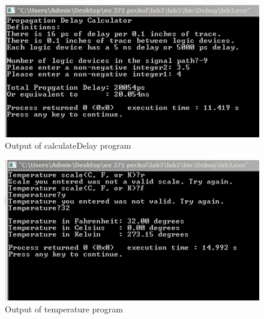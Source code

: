 \documentclass{article}
\begin{document}
    \begin{figure}[H]
      \centering
      \includegraphics[width=0.75\linewidth]{figures/c/calculateDelay_output.png}
      \caption{Output of calculateDelay program}
      \label{fig:calculateDelay_output}
    \end{figure}

    \begin{figure}[H]
      \centering
      \includegraphics[width=0.75\linewidth]{figures/c/tempConv_output.png}
      \caption{Output of temperature program}
      \label{fig:tempConv_output}
    \end{figure}
\end{document}
